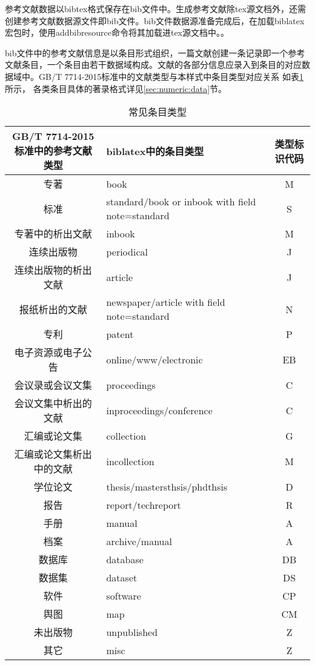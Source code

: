 参考文献数据以bibtex格式保存在bib文件中。生成参考文献除tex源文档外，还需创建参考文献数据源文件即bib文件。bib文件数据源准备完成后，在加载biblatex宏包时，使用addbibresource命令将其加载进tex源文档中。。

bib文件中的参考文献信息是以条目形式组织，一篇文献创建一条记录即一个参考文献条目，一个条目由若干数据域构成。文献的各部分信息应录入到条目的对应数据域中。GB/T 7714-2015标准中的文献类型与本样式中条目类型对应关系
如表\ref{tab:entrytypes}所示，
各类条目具体的著录格式详见\ref{sec:numeric:data}节。
\begin{table}[!htb]
\centering
\caption{常见条目类型}\label{tab:entrytypes}
\small
\begin{tabular}{clc}
\hline
  GB/T 7714-2015标准中的参考文献类型 &  biblatex中的条目类型 &  类型标识代码\\ \hline
  专著& book & M\\
  标准& standard/book or inbook with field note=standard& S\\
  专著中的析出文献& inbook & M\\
  连续出版物& periodical& J\\
  连续出版物的析出文献& article& J\\
  报纸析出的文献& newspaper/article with field note=standard& N\\
  专利& patent& P\\
  电子资源或电子公告& online/www/electronic& EB\\
  会议录或会议文集& proceedings& C\\
  会议文集中析出的文献& inproceedings/conference& C\\
  汇编或论文集& collection& G\\
  汇编或论文集析出中的文献& incollection& M\\
  学位论文& thesis/mastersthsis/phdthsis& D\\
  报告& report/techreport& R\\
  手册& manual& A\\
  档案& archive/manual& A\\
  数据库& database& DB\\
  数据集& dataset& DS\\
  软件& software& CP\\
  舆图& map& CM\\
  未出版物& unpublished& Z\\
  其它& misc& Z\\
  \hline
  \end{tabular}
\end{table}


